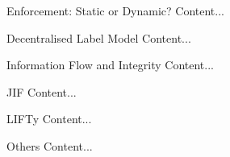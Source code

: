 \begin{frame}{Enforcement: Static or Dynamic?}
	Content...
\end{frame}

\begin{frame}{Decentralised Label Model}
	Content...
\end{frame}

\begin{frame}{Information Flow and Integrity}
	Content...
\end{frame}

\begin{frame}{JIF}
	Content...
\end{frame}

\begin{frame}{LIFTy}
	Content...
\end{frame}

\begin{frame}{Others}
	Content...
\end{frame}